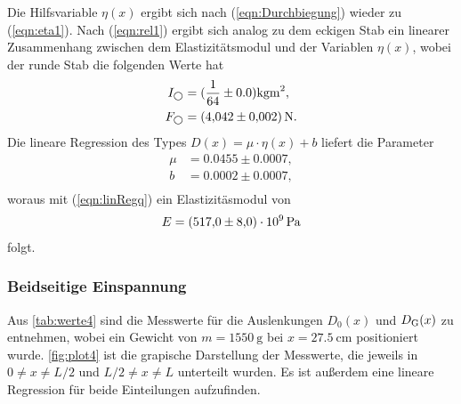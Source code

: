 \sloppy
Die Hilfsvariable $\eta(x)$ ergibt sich nach (\ref{eqn:Durchbiegung}) wieder zu (\ref{eqn:eta1}).
Nach (\ref{eqn:rel1}) ergibt sich analog zu dem eckigen Stab ein linearer Zusammenhang zwischen dem Elastizitätsmodul und
der Variablen $\eta(x)$, wobei der runde Stab die folgenden Werte hat
\begin{align*}
  I_{\bigcirc} &= (\frac{1}{64} \pm 0.0) \si{\kilo\gram\meter^2}, \\
  F_{\bigcirc} &= \SI{4.042 (0.002)}{\newton}. \\
\end{align*}
Die lineare Regression des Types $D(x) = \mu\cdot\eta(x)+b$ liefert die Parameter
\begin{align*}
  \mu &= 0.0455 \pm 0.0007,\\
  b &= 0.0002 \pm 0.0007, \\
\end{align*}
woraus mit (\ref{eqn:linRegq}) ein Elastizitäsmodul von
\begin{align*}
  E = \SI{517 (8.0)e9}{\Pa}
\end{align*}
folgt.


\subsubsection{Beidseitige Einspannung}
\label{subsubsec:rundBeidEins}
Aus \autoref{tab:werte4} sind die Messwerte für die Auslenkungen $D_0(x)$ und $D_{\text G}(x)$ zu entnehmen, wobei ein Gewicht von
$m=\SI{1550}{\gram}$ bei $x=\SI{27.5}{\cm}$ positioniert wurde. \autoref{fig:plot4} ist die grapische Darstellung der Messwerte, die 
jeweils in $0 \neq x \neq L/2$ und $L/2 \neq x\neq L$ unterteilt wurden. Es ist außerdem eine lineare Regression für beide Einteilungen
aufzufinden.

